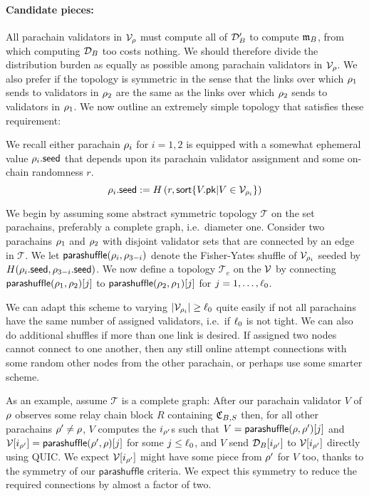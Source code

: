 \smallskip
\paragraph{Candidate pieces:}

All parachain validators in $\mathcal{V}_{\rho}$ must compute all of $\mathcal{D}'_B$ to compute $\mathfrak{m}_B$, from which computing $\mathcal{D}_B$ too costs nothing.  We should therefore divide the distribution burden as equally as possible among parachain validators in $\mathcal{V}_{\rho}$.  We also prefer if the topology is symmetric in the sense that the links over which $\rho_1$ sends to validators in $\rho_2$ are the same as the links over which $\rho_2$ sends to validators in $\rho_1$.  We now outline an extremely simple topology that satisfies these requirement:

We recall either parachain $\rho_i$ for $i=1,2$ is equipped with a somewhat ephemeral value $\rho_i.\mathsf{seed}$ that depends upon its parachain validator assignment and some on-chain randomness $r$.
$$ \rho_i.\mathsf{seed} := H\left( r, \mathsf{sort} \{  V.\mathsf{pk}  |  V \in \mathcal{V}_{\rho_i}  \} \right) $$

We begin by assuming some abstract symmetric topology $\mathcal{T}$ on the set parachains, preferably a complete graph, i.e.\ diameter one.  Consider two parachains $\rho_1$ and $\rho_2$ with disjoint validator sets that are connected by an edge in $\mathcal{T}$.  We let $\mathsf{parashuffle}(\rho_i,\rho_{3-i})$ denote the Fisher-Yates shuffle of $\mathcal{V}_{\rho_i}$ seeded by $H( \rho_i.\mathsf{seed}, \rho_{3-i}.\mathsf{seed} )$.  We now define a topology $\mathcal{T}_e$ on the $\mathcal{V}$ by connecting $\mathsf{parashuffle}(\rho_1,\rho_2)[j]$ to $\mathsf{parashuffle}(\rho_2,\rho_1)[j]$ for $j = 1,\ldots,\ell_0$.

We can adapt this scheme to varying $|\mathcal{V}_{\rho_i}| \ge \ell_0$ quite easily if not all parachains have the same number of assigned validators, i.e.\ if $\ell_0$ is not tight.  We can also do additional shuffles if more than one link is desired.  
% 
If assigned two nodes cannot connect to one another, then any still online attempt connections with some random other nodes from the other parachain, or perhaps use some smarter scheme. 

As an example, assume $\mathcal{T}$ is a complete graph:  After our parachain validator $V$ of $\rho$ observes some relay chain block $R$ containing $\mathfrak{C}_{B,S}$ then, for all other parachains $\rho' \ne \rho$, $V$ computes the $i_{\rho'}$s such that $V = \mathsf{parashuffle}(\rho,\rho')[j]$ and $\mathcal{V}[i_{\rho'}] = \mathsf{parashuffle}(\rho',\rho)[j]$ for some $j \leq \ell_0$, and $V$ send $\mathcal{D}_B[i_{\rho'}]$ to $\mathcal{V}[i_{\rho'}]$ directly using QUIC.  We expect $\mathcal{V}[i_{\rho'}]$ might have some piece from $\rho'$ for $V$ too, thanks to the symmetry of our $\mathsf{parashuffle}$ criteria.  We expect this symmetry to reduce the required connections by almost a factor of two.

